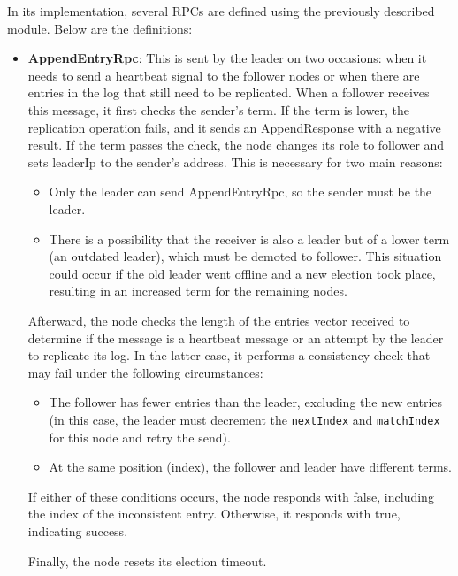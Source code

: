 In its implementation, several RPCs are defined using the previously described module. 
Below are the definitions:
\begin{itemize}
  \item \textbf{AppendEntryRpc}: This is sent by the leader on two occasions: when it needs
    to send a heartbeat signal to the follower nodes or when there are entries in the log 
    that still need to be replicated.
    When a follower receives this message, it first checks the sender’s term. If the term 
    is lower, the replication operation fails, and it sends an AppendResponse with a negative 
    result. If the term passes the check, the node changes its role to follower and sets 
    leaderIp to the sender’s address. This is necessary for two main reasons:
    \begin{itemize}
      \item Only the leader can send AppendEntryRpc, so the sender must be the leader.
      \item There is a possibility that the receiver is also a leader but of a lower 
        term (an outdated leader), which must be demoted to follower. This situation 
        could occur if the old leader went offline and a new election took place, 
        resulting in an increased term for the remaining nodes.
    \end{itemize}
    Afterward, the node checks the length of the entries vector received to determine 
    if the message is a heartbeat message or an attempt by the leader to replicate its log. 
    In the latter case, it performs a consistency check that may fail under the following 
    circumstances:
    \begin{itemize}
      \item The follower has fewer entries than the leader, excluding the new entries 
        (in this case, the leader must decrement the \texttt{nextIndex} and \texttt{matchIndex} for this 
        node and retry the send).
      \item At the same position (index), the follower and leader have different terms. 
    \end{itemize}
    If either of these conditions occurs, the node responds with false, including 
    the index of the inconsistent entry. Otherwise, it responds with true, indicating success.
        
    Finally, the node resets its election timeout.


\end{itemize}

